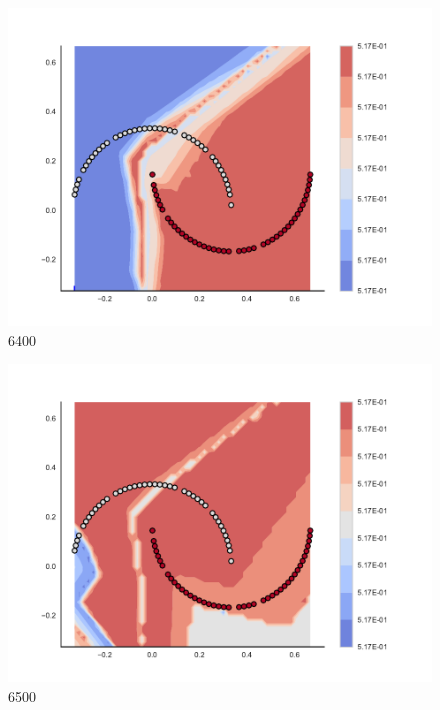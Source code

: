\begin{subfigure}[b]{0.09\textwidth}
    \includegraphics[clip, trim=2.35cm 1.75cm 4.5cm 0cm,width=\textwidth]{img/convergence/6400.pdf}
    \caption{6400}
    \label{fig:convergence_6400}
\end{subfigure}
%
\begin{subfigure}[b]{0.09\textwidth}
    \includegraphics[clip, trim=2.35cm 1.75cm 4.5cm 0cm,width=\textwidth]{img/convergence/6500.pdf}
    \caption{6500}
    \label{fig:convergence_6500}
\end{subfigure}
%
